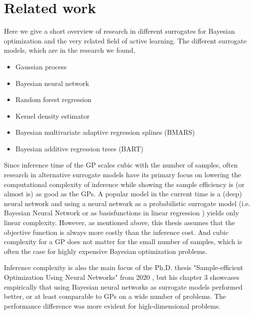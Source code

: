     

\section{Related work}
Here we give a short overview of research in different surrogates for Bayesian optimization
and the very related field of active learning. The different surrogate models, which are in the 
research we found, 
\begin{itemize}[noitemsep]
    \item Gaussian process
    \item Bayesian neural network
    \item Random forest regression
    \item Kernel density estimator
    \item Bayesian multivariate adaptive regression splines (BMARS)
    \item Bayesian additive regression trees (BART)
\end{itemize}

Since inference time of the GP scales cubic with the number of samples, often research in
alternative surrogate models have its primary focus on lowering the computational complexity of
inference while showing the sample efficiency is (or almost is) as good as the GPs. A popular model
in the current time is a (deep) neural network and using a neural network as a probabilistic
surrogate model (i.e. Bayesian Neural Network \cite{BOHAMIANN} or as basisfunctions in linear
regression \cite{DNGO}) yields only linear complexity. However, as mentioned above, this thesis
assumes that the objective function is always more costly than the inference cost. And cubic
complexity for a GP does not matter for the small number of samples, which is often the case for
highly expensive Bayesian optimization problems. 

Inference complexity is also the main focus of the Ph.D. thesis "Sample-efficient Optimization Using
Neural Networks" from 2020 \cite{PhDthesis}, but his chapter 3 showcases empirically that using Bayesian
neural networks as surrogate models performed better, or at least comparable to GPs on a wide number
of problems. The performance difference was more evident for high-dimensional problems.

